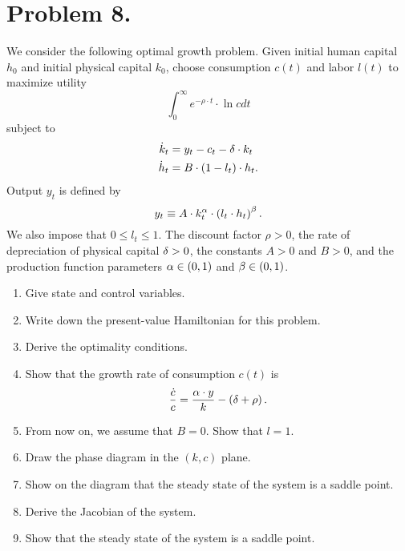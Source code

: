 \documentclass[letterpaper,12pt,leqno]{article}
\begin{document}
\section*{Problem 8.}

We consider the following optimal growth problem. Given initial human capital $h_{0}$ and initial physical capital $k_{0}$, choose consumption $c(t) $ and labor $l(t) $ to maximize utility
\begin{equation*}
\int_{0}^{\infty}e^{-\rho\cdot  t}\cdot \ln{c} dt
\end{equation*}
subject to
\begin{align*}
\dot{k}_{t} &=y_{t}-c_{t}-\delta\cdot  k_{t} \\
\dot{h}_{t} &=B\cdot \left( 1-l_{t} \right)\cdot  h_{t}.
\end{align*}
Output $y_{t}$ is defined by
\[y_{t}\equiv A\cdot k_{t}^{\alpha}\cdot \left( l_{t}\cdot h_{t} \right) ^{\beta}.\]
We also impose that $0 \leq l_{t}\leq 1$. The discount factor $\rho>0$, the rate of depreciation of physical capital $\delta>0$, the constants $A>0$ and $B>0$, and the production function parameters $\alpha\in \left( 0,1 \right)$ and $\beta \in\left( 0,1 \right)$.

\begin{enumerate}
\item Give state and control variables.
\item Write down the present-value Hamiltonian for this problem.
\item Derive the optimality conditions. 
\item Show that the growth rate of consumption $c(t)$ is
\begin{equation*}
\frac{\dot{c}}{c}=\frac{\alpha\cdot  y}{k}-\left( \delta +\rho \right) .
\end{equation*}
\item From now on, we assume that $B=0$. Show that $l=1$.
\item Draw the phase diagram in the $(k,c)$ plane.
\item Show on the diagram that the steady state of the system is a saddle point.
\item Derive the Jacobian of the system.
\item Show that the steady state of the system is a saddle point.
\end{enumerate}
\end{document}
